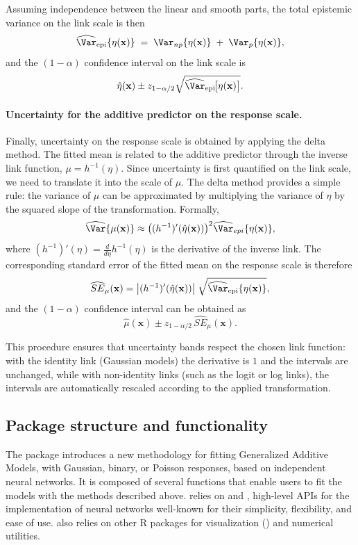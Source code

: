 Assuming independence between the linear and smooth parts, the total epistemic variance on the link scale is then
\[
\widehat{\Var}_{\text{epi}}\{\eta(\mathbf{x})\}
\;=\; \Var_{np}\{\eta(\mathbf{x})\} \;+\; \Var_p\{\eta(\mathbf{x})\},
\]
and the $(1-\alpha)$ confidence interval on the link scale is 
\[
\hat\eta(\mathbf{x}) \pm z_{1-\alpha/2} \sqrt{\widehat{\Var}_{\mathrm{epi}}\!\bigl[\eta(\mathbf{x})\bigr]}.
\]

\paragraph{Uncertainty for the additive predictor on the response scale.}

Finally, uncertainty on the response scale is obtained by applying the delta method. The fitted mean is related to the additive predictor through the inverse link function, $\mu = h^{-1}(\eta)$. Since uncertainty is first quantified on the link scale, we need to translate it into the scale of $\mu$. The delta method provides a simple rule: the variance of $\mu$ can be approximated by multiplying the variance of $\eta$ by the squared slope of the transformation. Formally,
\[
\widehat{\Var} \{\mu(\mathbf{x}) \} \approx \bigl((h^{-1})'(\hat\eta(\mathbf{x}))\bigr)^2 \widehat{\Var}_{epi}\{\eta(\mathbf{x})\},
\]
where $(h^{-1})'(\eta) = \tfrac{d}{d\eta}h^{-1}(\eta)$ is the derivative of the inverse link. The corresponding standard error of the fitted mean on the response scale is therefore
\[
\widehat{SE}_\mu(\mathbf{x})
= \bigl|(h^{-1})'(\hat\eta(\mathbf{x}))\bigr|\;
\sqrt{\widehat{\Var}_{\text{epi}}\{\eta(\mathbf{x})\}},
\]
and the $(1-\alpha)$ confidence interval can be obtained as
\[
\hat\mu (\mathbf{x}) \pm z_{1-\alpha/2}\,\widehat{SE}_\mu(\mathbf{x}).
\]

This procedure ensures that uncertainty bands respect the chosen link function: with the identity link (Gaussian models) the derivative is $1$ and the intervals are unchanged, while with non-identity links (such as the logit or log links), the intervals are automatically rescaled according to the applied transformation.

\subsection{Package structure and functionality}
\label{package_struc}

The  package introduces a new methodology for fitting Generalized Additive Models, with Gaussian, binary, or Poisson responses, based on independent neural networks. It is composed of several functions that enable users to fit the models with the methods described above.  relies on  \citep{chollet2015keras} and  \citep{tensorflow2015-whitepaper}, high-level APIs for the implementation of neural networks well-known for their simplicity, flexibility, and ease of use.  also relies on other \textsf{R} packages for visualization () and numerical utilities.

